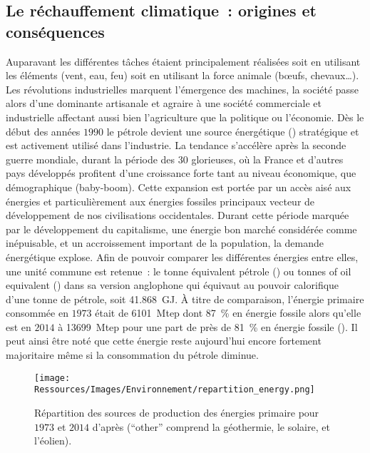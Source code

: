 \subsection{Le réchauffement climatique~: origines et conséquences} %
\label{sub:le_rechauffement_climatique_origines_et_consequences}
Auparavant les différentes tâches étaient principalement réalisées soit en utilisant les
éléments (vent, eau, feu) soit en utilisant la force animale (bœufs, chevaux\dots). Les
révolutions industrielles marquent l’émergence des machines, la société passe alors d’une
dominante artisanale et agraire à une société commerciale et industrielle affectant aussi
bien l’agriculture que la politique ou l’économie. Dès le début des années $1990$ le
pétrole devient une source énergétique () stratégique et est
activement utilisé dans l’industrie. La tendance s’accélère après la seconde guerre
mondiale, durant la période des $30$ glorieuses, où la France et d’autres pays développés
profitent d’une croissance forte tant au niveau économique, que démographique (baby-boom).
Cette expansion est portée par un accès aisé aux énergies et particulièrement aux énergies
fossiles principaux vecteur de développement de nos civilisations occidentales. Durant
cette période marquée par le développement du capitalisme, une énergie bon marché
considérée comme inépuisable, et un accroissement important de la population, la demande
énergétique explose. Afin de pouvoir comparer les différentes énergies entre elles, une
unité commune est retenue~: le tonne équivalent pétrole () ou tonnes of oil
equivalent () dans sa version anglophone qui équivaut au pouvoir calorifique
d’une tonne de pétrole, soit \SI{41.868}{\giga\joule}.
À titre de comparaison, l’énergie primaire consommée en $1973$ était de
\SI{6101}{\mega tep} dont \SI{87}{\percent} en énergie fossile alors qu’elle est en $2014$
à \SI{13699}{\mega tep} pour une part de près de \SI{81}{\percent} en énergie fossile
(). Il peut ainsi être noté que cette énergie
reste aujourd’hui encore fortement majoritaire même si la consommation du pétrole diminue.

\begin{figure}
    \centering
    \texttt{[image: Ressources/Images/Environnement/repartition\_energy.png]}
    \caption{Répartition des sources de production des énergies primaire pour
             $1973$ et $2014$ d’après \textcite{IEA2016} (\enquote{other} comprend
             la géothermie, le solaire, et l’éolien).}
    \label{fig:energy_fraction}
\end{figure}


